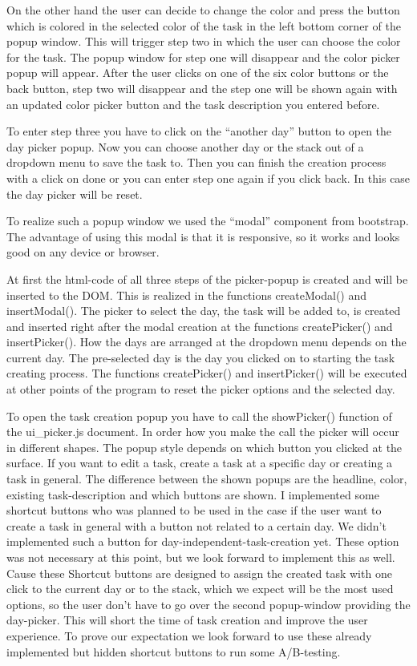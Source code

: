 On the other hand the user can decide to change the color and press the button which is colored in the selected color of the task in the left bottom corner of the popup window. This will trigger step two in which the user can choose the color for the task. The popup window for step one will disappear and the color picker popup will appear. After the user clicks on one of the six color buttons or the back button, step two will disappear and the step one will be shown again with an updated color picker button and the task description you entered before.

To enter step three you have to click on the “another day” button to open the day picker popup. Now you can choose another day or the stack out of a dropdown menu to save the task to. Then you can finish the creation process with a click on done or you can enter step one again if you click back. In this case the day picker will be reset.

To realize such a popup window we used the “modal” component from bootstrap. The advantage of using this modal is that it is responsive, so it works and looks good on any device or browser.  

At first the html-code of all three steps of the picker-popup is created and will be inserted to the DOM. This is realized in the functions createModal() and insertModal(). The picker to select the day, the task will be added to, is created and inserted right after the modal creation at the functions createPicker() and insertPicker(). How the days are arranged at the dropdown menu depends on the current day. The pre-selected day is the day you clicked on to starting the task creating process. The functions createPicker() and insertPicker() will be executed at other points of the program to reset the picker options and the selected day. 

To open the task creation popup you have to call the showPicker() function of the ui\_picker.js document. In order how you make the call the picker will occur in different shapes. The popup style depends on which button you clicked at the surface. If you want to edit a task, create a task at a specific day or creating a task in general. The difference between the shown popups are the headline, color, existing task-description and which buttons are shown. I implemented some shortcut buttons who was planned to be used in the case if the user want to create a task in general with a button not related to a certain day. We didn’t implemented such a button for day-independent-task-creation yet. These option was not necessary at this point, but we look forward to implement this as well. Cause these Shortcut buttons are designed to assign the created task with one click to the current day or to the stack, which we expect will be the most used options, so the user don’t have to go over the second popup-window providing the day-picker. This will short the time of task creation and improve the user experience. To prove our expectation we look forward to use these already implemented but hidden shortcut buttons to run some A/B-testing.



